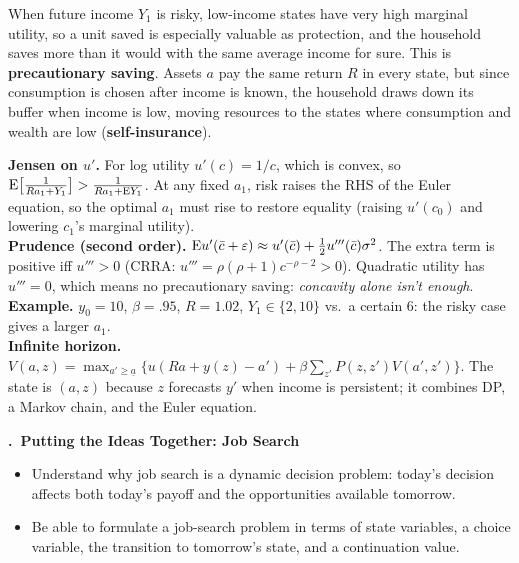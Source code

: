 \documentclass[11pt]{article}
\newcounter{qn}
\newcommand{\question}[1]{\par\needspace{14\baselineskip}\refstepcounter{qn}\medskip
{\bfseries\color{ink}\large \theqn.\ #1}\par\smallskip}
\begin{document}
\begin{resp}
\begin{minipage}[t]{0.62\textwidth}\vspace{0pt}
When future income $Y_1$ is risky, low-income states have very high marginal utility, so a unit saved is especially valuable as protection, and the household saves more than it would with the same average income for sure. This is \textbf{precautionary saving}. Assets $a$ pay the same return $R$ in every state, but since consumption is chosen after income is known, the household draws down its buffer when income is low, moving resources to the states where consumption and wealth are low (\textbf{self-insurance}).
\end{minipage}\hfill
\begin{minipage}[t]{0.34\textwidth}\vspace{0pt}\centering
\scalebox{0.75}{\figPrecaution}
\end{minipage}
\end{resp}
\begin{intu}
\textbf{Jensen on $u'$.} For log utility $u'(c)=1/c$, which is convex, so $\mathrm{E}\big[\frac{1}{Ra_1+Y_1}\big]>\frac{1}{Ra_1+\mathrm{E} Y_1}$. At any fixed $a_1$, risk raises the RHS of the Euler equation, so the optimal $a_1$ must rise to restore equality (raising $u'(c_0)$ and lowering $c_1$'s marginal utility).\\
\textbf{Prudence (second order).} $\mathrm{E} u'(\bar c+\varepsilon)\approx u'(\bar c)+\tfrac12u'''(\bar c)\sigma^2$. The extra term is positive iff $u'''>0$ (CRRA: $u'''=\rho(\rho+1)c^{-\rho-2}>0$). Quadratic utility has $u'''=0$, which means no precautionary saving: \emph{concavity alone isn't enough}.\\
\textbf{Example.} $y_0=10$, $\beta=.95$, $R=1.02$, $Y_1\in\{2,10\}$ vs.\ a certain 6: the risky case gives a larger $a_1$.\\
\textbf{Infinite horizon.} $V(a,z)=\max_{a'\ge\underline a}\{u(Ra+y(z)-a')+\beta\sum_{z'}P(z,z')V(a',z')\}$. The state is $(a,z)$ because $z$ forecasts $y'$ when income is persistent; it combines DP, a Markov chain, and the Euler equation.
\end{intu}

\question{Putting the Ideas Together: Job Search}
\begin{itemize}[leftmargin=1.2em,itemsep=0pt]\itshape
\item Understand why job search is a dynamic decision problem: today's decision affects both today's payoff and the opportunities available tomorrow.
\item Be able to formulate a job-search problem in terms of state variables, a choice variable, the transition to tomorrow's state, and a continuation value.
\end{itemize}
\end{document}
